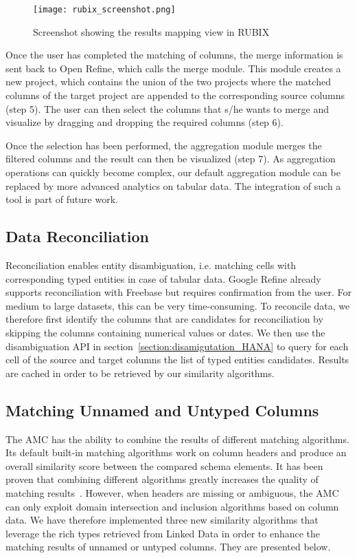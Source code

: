 \begin{figure}[ht!]
  \centering
    \texttt{[image: rubix\_screenshot.png]}
  \caption{Screenshot showing the results mapping view in RUBIX}
  \label{figure:rubix_screenshot}
\end{figure}

Once the user has completed the matching of columns, the merge information is sent back to Open Refine, which calls the merge module. This module creates a new project, which contains the union of the two projects where the matched columns of the target project are appended to the corresponding source columns (step 5). The user can then select the columns that s/he wants to merge and visualize by dragging and dropping the required columns (step 6).

Once the selection has been performed, the aggregation module merges the filtered columns and the result can then be visualized (step 7). As aggregation operations can quickly become complex, our default aggregation module can be replaced by more advanced analytics on tabular data. The integration of such a tool is part of future work.

\subsection{Data Reconciliation}
Reconciliation enables entity disambiguation, i.e. matching cells with corresponding typed entities in case of tabular data. Google Refine already supports reconciliation with Freebase but requires confirmation from the user. For medium to large datasets, this can be very time-consuming. To reconcile data, we therefore first identify the columns that are candidates for reconciliation by skipping the columns containing numerical values or dates. We then use the disambiguation API in section~\ref{section:disamigutation_HANA} to query for each cell of the source and target columns the list of typed entities candidates. Results are cached in order to be retrieved by our similarity algorithms.

\subsection{Matching Unnamed and Untyped Columns}

The AMC has the ability to combine the results of different matching algorithms. Its default built-in matching algorithms work on column headers and produce an overall similarity score between the compared schema elements. It has been proven that combining different algorithms greatly increases the quality of matching results~\cite{Peukert:ICDE:12}\cite{conf/wise/StracciaT05}. However, when headers are missing or ambiguous, the AMC can only exploit domain intersection and inclusion algorithms based on column data. We have therefore implemented three new similarity algorithms that leverage the rich types retrieved from Linked Data in order to enhance the matching results of unnamed or untyped columns. They are presented below.


